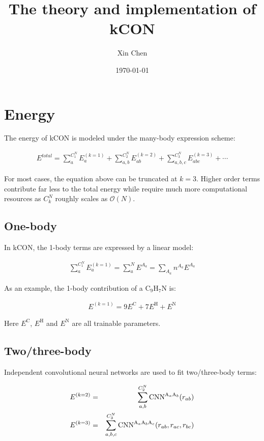 \documentclass{article}
\title{The theory and implementation of kCON}
\author{Xin Chen}
\date{\today}
\begin{document}
\maketitle


\section{Energy}

The energy of kCON is modeled under the many-body expression scheme:

\begin{eqnarray}
E^{total} = \sum_{a}^{C^N_1}{E^{(k=1)}_{a}} + \sum_{a,b}^{C^{N}_2}{E^{(k=2)}_{ab}} 
+ \sum_{a,b,c}^{C^{N}_3}{E^{(k=3)}_{abc}} + \cdots
\end{eqnarray}

\noindent For most cases, the equation above can be truncated at $k = 3$. Higher order 
terms contribute far less to the total energy while require much more computational
resources as $C^N_k$ roughly scales as $\mathcal{O}(N)$.

\subsection{One-body}

In kCON, the 1-body terms are expressed by a linear model:

\begin{eqnarray}
\sum_{a}^{C^N_1}{E^{(k=1)}_{a}} = \sum_{a}^{N}{E^{A_a}} = \sum_{A_{a}}{n^{A_a}E^{A_a}}
\end{eqnarray}

\noindent As an example, the 1-body contribution of a 
$\mathrm{C}_9 \mathrm{H}_7 \mathrm{N}$ is:

\begin{eqnarray}
E^{(k=1)} = 9E^{\mathrm{C}} + 7E^{\mathrm{H}} + E^{\mathrm{N}}
\end{eqnarray}

\noindent Here $E^{\mathrm{C}}$, $E^{\mathrm{H}}$ and $E^{\mathrm{N}}$ are all
trainable parameters.

\subsection{Two/three-body}

Independent convolutional neural networks are used to fit two/three-body terms:

\begin{eqnarray}
E^{(k=2)} & = & \sum_{a,b}^{C^N_2}{
	\boldmath{\mathrm{CNN}}^{\mathrm{A}_{a}\mathrm{A}_{b}}
}(r_{ab}) \\
E^{(k=3)} & = & \sum_{a,b,c}^{C^N_3}{
	\boldmath{\mathrm{CNN}}^{\mathrm{A}_{a}\mathrm{A}_{b}\mathrm{A}_{c}}
}(r_{ab}, r_{ac}, r_{bc})
\end{eqnarray}
\end{document}
